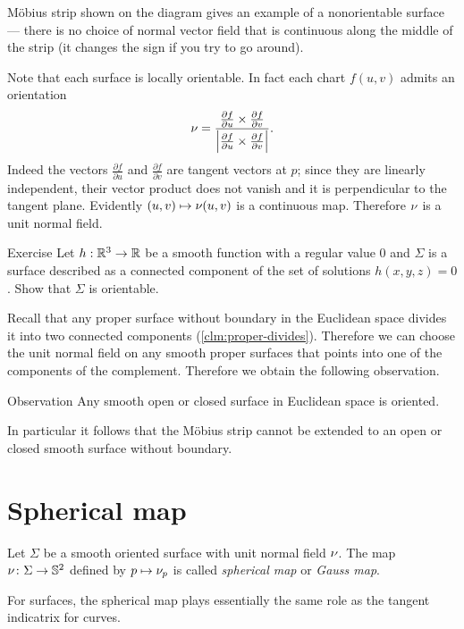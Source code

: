 M\"obius strip shown on the diagram gives an example of a nonorientable surface --- there is no choice of normal vector field that is continuous along the middle of the strip (it changes the sign if you try to go around).


Note that each surface is locally orientable.
In fact each chart $f(u,v)$ admits an orientation 
\[\nu=
\frac{\tfrac{\partial f}{\partial u}\times \tfrac{\partial f}{\partial v}}
{\left|\tfrac{\partial f}{\partial u}\times \tfrac{\partial f}{\partial v}\right|}.\]
Indeed the vectors $\tfrac{\partial f}{\partial u}$ and $\tfrac{\partial f}{\partial v}$ are tangent vectors at $p$; 
since they are linearly independent, their vector product does not vanish and it is perpendicular to the tangent plane.
Evidently $(u,v)\mapsto \nu(u,v)$ is a continuous map.
Therefore $\nu$ is a unit normal field. 

\begin{thm}{Exercise}\label{ex:implicit-orientable}
Let $h:\mathbb{R}^3\to\mathbb{R}$ be a smooth function with a regular value $0$ and $\Sigma$ is a surface described as a connected component of the set of solutions $h(x,y,z)=0$.
Show that $\Sigma$ is orientable.
\end{thm}

Recall that any proper surface without boundary in the Euclidean space divides it into two connected components (\ref{clm:proper-divides}).
Therefore we can choose the unit normal field on any smooth proper surfaces that points into one of the components of the complement.
Therefore we obtain the following observation. 

\begin{thm}{Observation}
Any smooth open or closed surface in Euclidean space is oriented.
\end{thm}

In particular it follows that the M\"obius strip cannot be extended to an open or closed smooth surface without boundary.


\section*{Spherical map}

Let $\Sigma$ be a smooth oriented surface with unit normal field $\nu$.
The map $\nu\colon\Sigma\to \mathbb{S}^2$ defined by $p\mapsto \nu_p$ is called \emph{spherical map} or \emph{Gauss map}.

For surfaces, the spherical map plays essentially the same role as the tangent indicatrix for curves.


